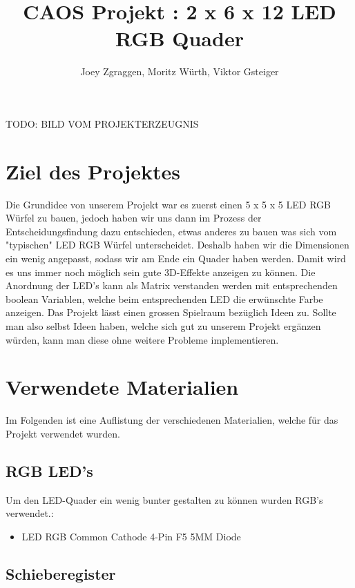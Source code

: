 \documentclass[12pt,a4paper]{article}
\title{\textbf{CAOS Projekt : 2 x 6 x 12 LED RGB Quader}}
\author{Joey Zgraggen, Moritz Würth, Viktor Gsteiger}
\begin{document}
\renewcommand\contentsname{Inhaltsverzeichnis}
\begin{titlepage}
\maketitle
TODO: BILD VOM PROJEKTERZEUGNIS
\end{titlepage}
\tableofcontents
\newpage

\section{Ziel des Projektes}

Die Grundidee von unserem Projekt war es zuerst einen 5 x 5 x 5 LED RGB Würfel zu bauen, jedoch haben wir uns dann im Prozess der Entscheidungsfindung
dazu entschieden, etwas anderes zu bauen was sich vom "typischen" LED RGB Würfel unterscheidet.
Deshalb haben wir die Dimensionen ein wenig angepasst, sodass wir am Ende ein Quader haben werden. Damit wird es uns immer noch möglich sein gute 3D-Effekte
anzeigen zu können. Die Anordnung der LED's kann als Matrix verstanden werden mit entsprechenden boolean Variablen, welche beim entsprechenden LED die erwünschte Farbe
anzeigen. 
Das Projekt lässt einen grossen Spielraum bezüglich Ideen zu. Sollte man also selbst Ideen haben, welche sich gut zu unserem Projekt ergänzen würden, kann man diese ohne weitere
Probleme implementieren.


\section{Verwendete Materialien}

Im Folgenden ist eine Auflistung der verschiedenen Materialien, welche für das Projekt verwendet wurden.

\subsection{RGB LED's}

Um den LED-Quader ein wenig bunter gestalten zu können wurden RGB's verwendet.:

\begin{itemize}
    \item LED RGB Common Cathode 4-Pin F5 5MM Diode
\end{itemize}

\subsection{Schieberegister}
\end{document}
